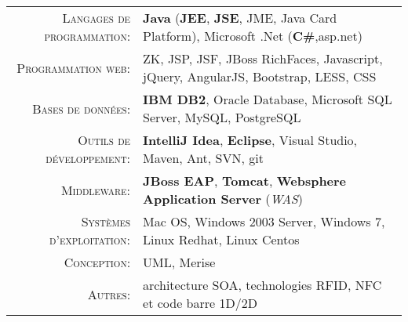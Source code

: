%
%
%

\renewcommand{\arraystretch}{1.1}

	\begin{tabular}{>{}r>{}p{13cm}} 
		\textsc{Langages de programmation:}  		&   \textbf{Java} (\textbf{JEE}, \textbf{JSE}, JME, Java Card Platform), Microsoft .Net (\textbf{C\#},asp.net)\\ 
		\textsc{Programmation web:}               	&   ZK, JSP, JSF, JBoss RichFaces, Javascript, jQuery, AngularJS, Bootstrap, LESS, CSS\\ 
		\textsc{Bases de données:}                  &   \textbf{IBM DB2}, Oracle Database, Microsoft SQL Server, MySQL, PostgreSQL \\ 
		\textsc{Outils de développement:}	  		&   \textbf {IntelliJ Idea}, \textbf {Eclipse}, Visual Studio, Maven, Ant, SVN, git\\
		\textsc{Middleware:}				        &   \textbf{JBoss EAP}, \textbf{Tomcat}, \textbf{Websphere Application Server} (\emph{WAS})\\ 
		\textsc{Systèmes d'exploitation:}	        &   Mac OS, Windows 2003 Server, Windows 7, Linux Redhat, Linux Centos\\ 
		\textsc{Conception:}				        &   UML, Merise\\
		\textsc{Autres:}					        &   architecture SOA, technologies RFID, NFC et code barre 1D/2D
	\end{tabular}